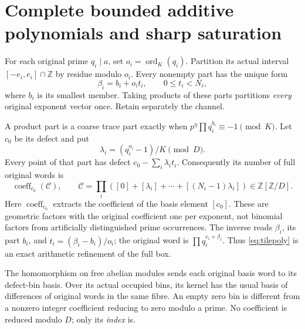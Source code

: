 

\section{Complete bounded additive polynomials and sharp saturation}\label{sec:tiles}
For each original prime $q_i\mid a$, set $o_i=\operatorname{ord}_K(q_i)$.
Partition its actual interval $[-e_i,e_i]\cap\mathbb Z$ by residue modulo $o_i$.
Every nonempty part has the unique form
\[
 \beta_i=b_i+o_i t_i,\qquad0\le t_i<N_i,
\]
where $b_i$ is its smallest member. Taking products of these parts partitions
\emph{every} original exponent vector once. Retain separately the channel.

A product part is a coarse trace part exactly when
$p^\eta\prod q_i^{b_i}\equiv-1\pmod K$. Let $c_0$ be its defect and put
\[
 \lambda_i=(q_i^{o_i}-1)/K\pmod D.
\]
Every point of that part has defect
$c_0-\sum_i\lambda_it_i$. Consequently its number of full original words is
\begin{equation}\label{eq:tilepoly}
 \operatorname{coeff}_{c_0}(\mathcal C),
 \qquad
 \mathcal C=\prod_i\left([0]+[\lambda_i]+\cdots+[(N_i-1)\lambda_i]\right)
 \in\mathbb Z[\mathbb Z/D].
\end{equation}
Here $\operatorname{coeff}_{c_0}$ extracts the coefficient of the basis
element $[c_0]$. These are geometric factors with the original coefficient one per exponent,
not binomial factors from artificially distinguished prime occurrences.
The inverse reads $\beta_i$, its part $b_i$, and
$t_i=(\beta_i-b_i)/o_i$; the original word is $\prod q_i^{e_i+\beta_i}$.
Thus \eqref{eq:tilepoly} is an exact arithmetic refinement of the full box.

The homomorphism on free abelian modules sends each original basis word to
its defect-bin basis. Over its actual occupied bins, its kernel has the usual
basis of differences of original words in the same fibre. An empty zero bin
is different from a nonzero integer coefficient reducing to zero modulo a
prime. No coefficient is reduced modulo $D$; only its \emph{index} is.

